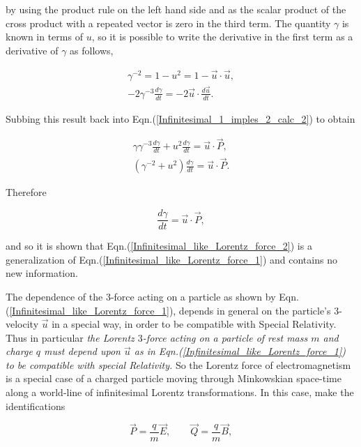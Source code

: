 \noindent by using the product rule on the left hand side and as the scalar product of the cross product with a repeated vector is zero in the third term. The quantity $\gamma$ is known in terms of $u$, so it is possible to write the derivative in the first term as a derivative of $\gamma$ as follows,

\begin{gather*} 
\gamma^{-2} = 1 - u^{2} = 1- \vec{u} \cdot \vec{u}, \\
-2 \gamma^{-3} \frac{d\gamma}{dt} = - 2 \vec{u} \cdot \frac{d \vec{u}}{dt}.
\end{gather*}

\noindent Subbing this result back into Eqn.(\ref{Infinitesimal_1_imples_2_calc_2}) to obtain

\begin{gather*} 
\gamma \gamma^{-3} \frac{d\gamma}{dt} + u^2 \frac{d\gamma}{dt} = \vec{u} \cdot \vec{P}, \\
(\gamma^{-2} + u^2) \frac{d\gamma}{dt} = \vec{u} \cdot \vec{P}.
\end{gather*} 

\noindent Therefore

\begin{equation*}
\frac{d\gamma}{dt} =  \vec{u} \cdot \vec{P},
\end{equation*}

\noindent and so it is shown that Eqn.(\ref{Infinitesimal_like_Lorentz_force_2}) is a generalization of Eqn.(\ref{Infinitesimal_like_Lorentz_force_1}) and contains no new information. 

The dependence of the $3$-force acting on a particle as shown by Eqn.(\ref{Infinitesimal_like_Lorentz_force_1}), depends in general on the particle's $3$-velocity $\vec{u}$ in a special way, in order to be compatible with Special Relativity. Thus in particular \textit{the Lorentz $3$-force acting on a particle of rest mass $m$ and charge $q$ must depend upon $\vec{u}$ as in Eqn.(\ref{Infinitesimal_like_Lorentz_force_1}) to be compatible with special Relativity.} So the Lorentz force of electromagnetism is a special case of a charged particle moving through Minkowskian space-time along a world-line of infinitesimal Lorentz transformations. In this case, make the identifications

\begin{equation}\label{Infinitesimal_P_Q_interms_E_B} 
\vec{P} = \frac{q}{m} \vec{E}, \qquad \vec{Q} = \frac{q}{m}\vec{B},
\end{equation} 

